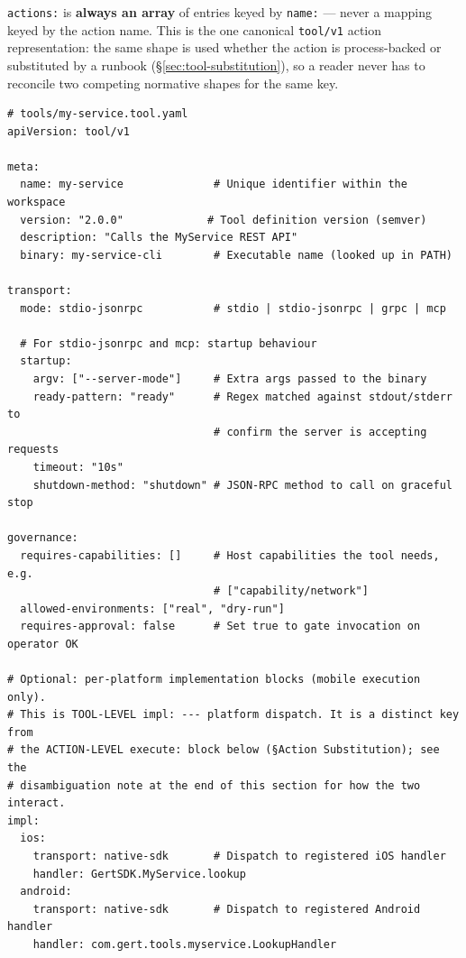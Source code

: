 \texttt{actions:} is \textbf{always an array} of entries keyed by
\texttt{name:} --- never a mapping keyed by the action name. This is the one
canonical \texttt{tool/v1} action representation: the same shape is used
whether the action is process-backed or substituted by a runbook
(\S\ref{sec:tool-substitution}), so a reader never has to reconcile two
competing normative shapes for the same key.

\begin{verbatim}
# tools/my-service.tool.yaml
apiVersion: tool/v1

meta:
  name: my-service              # Unique identifier within the workspace
  version: "2.0.0"             # Tool definition version (semver)
  description: "Calls the MyService REST API"
  binary: my-service-cli        # Executable name (looked up in PATH)

transport:
  mode: stdio-jsonrpc           # stdio | stdio-jsonrpc | grpc | mcp

  # For stdio-jsonrpc and mcp: startup behaviour
  startup:
    argv: ["--server-mode"]     # Extra args passed to the binary
    ready-pattern: "ready"      # Regex matched against stdout/stderr to
                                # confirm the server is accepting requests
    timeout: "10s"
    shutdown-method: "shutdown" # JSON-RPC method to call on graceful stop

governance:
  requires-capabilities: []     # Host capabilities the tool needs, e.g.
                                # ["capability/network"]
  allowed-environments: ["real", "dry-run"]
  requires-approval: false      # Set true to gate invocation on operator OK

# Optional: per-platform implementation blocks (mobile execution only).
# This is TOOL-LEVEL impl: --- platform dispatch. It is a distinct key from
# the ACTION-LEVEL execute: block below (§Action Substitution); see the
# disambiguation note at the end of this section for how the two interact.
impl:
  ios:
    transport: native-sdk       # Dispatch to registered iOS handler
    handler: GertSDK.MyService.lookup
  android:
    transport: native-sdk       # Dispatch to registered Android handler
    handler: com.gert.tools.myservice.LookupHandler


\end{verbatim}
